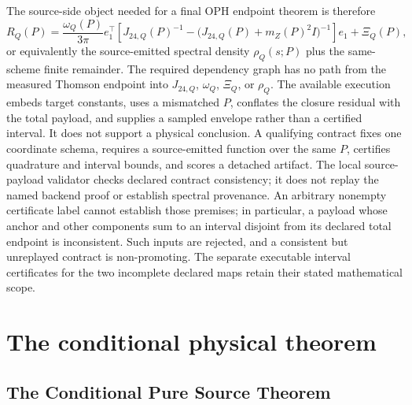 \documentclass[11pt]{article}
\theoremstyle{remark}
\newcommand{\Rq}{R_Q}
\begin{document}
The source-side object needed for a final OPH endpoint theorem is therefore
\begin{equation}
\Rq(P)
=
\frac{\omega_Q(P)}{3\pi}
e_1^\top\!\left[
J_{24,Q}(P)^{-1}
-
\bigl(J_{24,Q}(P)+m_Z(P)^2I\bigr)^{-1}
\right]e_1
+\Xi_Q(P),
\label{eq:sourceJ24Q}
\end{equation}
or equivalently the source-emitted spectral density \(\rho_Q(s;P)\) plus the same-scheme finite
remainder. The required dependency graph has no path from the measured Thomson endpoint into
\(J_{24,Q}\), \(\omega_Q\), \(\Xi_Q\), or \(\rho_Q\). The available execution embeds target
constants, uses a mismatched \(P\), conflates the closure residual with the total payload, and
supplies a sampled envelope rather than a certified interval. It does not
support a physical conclusion.
A qualifying contract fixes one coordinate schema, requires a source-emitted function over the
same \(P\), certifies quadrature and interval bounds, and scores a detached artifact.
The local source-payload validator checks declared contract consistency;
it does not replay the named backend proof or establish spectral provenance.
An arbitrary nonempty certificate label cannot establish those premises;
in particular, a payload whose anchor and other components sum to an interval
disjoint from its declared total endpoint is inconsistent. Such inputs are
rejected, and a consistent but unreplayed contract is non-promoting. The separate
executable interval certificates for the two incomplete declared maps
retain their stated mathematical scope.

\section{The conditional physical theorem}
\subsection{The Conditional Pure Source Theorem}
\label{sec:alpha-step-21}
\end{document}
